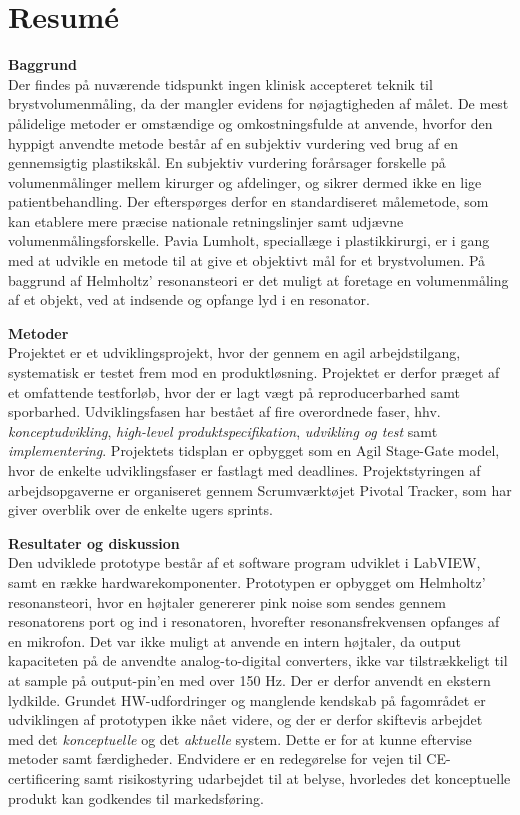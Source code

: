\section{Resumé}

\textbf{Baggrund} \\
Der findes på nuværende tidspunkt ingen klinisk accepteret teknik til brystvolumenmåling, da der mangler evidens for nøjagtigheden af målet. De mest pålidelige metoder er omstændige og omkostningsfulde at anvende, hvorfor den hyppigt anvendte metode består af en subjektiv vurdering ved brug af en gennemsigtig plastikskål. En subjektiv vurdering forårsager forskelle på volumenmålinger mellem kirurger og afdelinger, og sikrer dermed ikke en lige patientbehandling. Der efterspørges derfor en standardiseret målemetode, som kan etablere mere præcise nationale retningslinjer samt udjævne volumenmålingsforskelle. Pavia Lumholt, speciallæge i plastikkirurgi, er i gang med at udvikle en metode til at give et objektivt mål for et brystvolumen. På baggrund af Helmholtz' resonansteori er det muligt at foretage en volumenmåling af et objekt, ved at indsende og opfange lyd i en resonator.   

\textbf{Metoder} \\
Projektet er et udviklingsprojekt, hvor der gennem en agil arbejdstilgang, systematisk er testet frem mod en produktløsning. Projektet er derfor præget af et omfattende testforløb, hvor der er lagt vægt på reproducerbarhed samt sporbarhed. 
Udviklingsfasen har bestået af fire overordnede faser, hhv. \textit{konceptudvikling}, \textit{high-level produktspecifikation}, \textit{udvikling og test} samt \textit{implementering}.
Projektets tidsplan er opbygget som en Agil Stage-Gate model, hvor de enkelte udviklingsfaser er fastlagt med deadlines. Projektstyringen af arbejdsopgaverne er organiseret gennem Scrumværktøjet Pivotal Tracker, som har giver overblik over de enkelte ugers sprints.

\textbf{Resultater og diskussion}\\
Den udviklede prototype består af et software program
udviklet i LabVIEW, samt en række hardwarekomponenter. Prototypen er opbygget om Helmholtz' resonansteori, hvor en højtaler genererer pink noise som sendes gennem resonatorens port og ind i resonatoren, hvorefter resonansfrekvensen opfanges af en mikrofon. Det var ikke muligt at anvende en intern højtaler, da output kapaciteten på de anvendte analog-to-digital converters, ikke var tilstrækkeligt til at sample på output-pin'en med over 150 Hz. Der er derfor anvendt en ekstern lydkilde. Grundet HW-udfordringer og manglende kendskab på fagområdet er udviklingen af prototypen ikke nået videre, og der er derfor skiftevis arbejdet med det \textit{konceptuelle} og det \textit{aktuelle} system. Dette er for at kunne eftervise metoder samt færdigheder. 
Endvidere er en redegørelse for vejen til CE-certificering samt risikostyring udarbejdet til at belyse, hvorledes det konceptuelle produkt kan godkendes til markedsføring.
 
